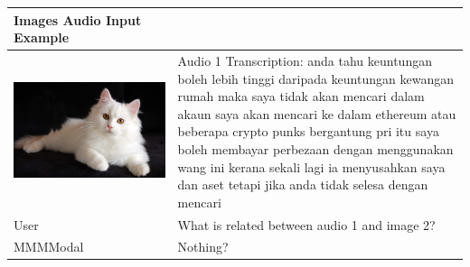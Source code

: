 \documentclass[preprint]{article}
\begin{document}
\begin{table}[hbt]
  \centering
  \setlength{\extrarowheight}{3pt}
  \renewcommand{\arraystretch}{1.5}
  \begin{tabular}{>{\arraybackslash}m{6.5cm}>{\arraybackslash}m{6.5cm}}
    \hline
    \textbf{Images Audio Input Example}                                                                                                                                                                                                                                                                                                                                                                                                                          \\[6pt]
    \hline
    \includegraphics[width=\linewidth,valign=c]{pic/Persian-cat-breed.jpg} & Audio 1 Transcription: anda tahu keuntungan boleh lebih tinggi daripada keuntungan kewangan rumah maka saya tidak akan mencari dalam akaun saya akan mencari ke dalam ethereum atau beberapa crypto punks bergantung pri itu saya boleh membayar perbezaan dengan menggunakan wang ini kerana sekali lagi ia menyusahkan saya dan aset tetapi jika anda tidak selesa dengan mencari \\
    \hline
    User                                                                   & What is related between audio 1 and image 2?                                                                                                                                                                                                                                                                                                                                        \\
    MMMModal                                                               & Nothing?                                                                                                                                                                                                                                                                                                                                                                            \\
    \hline
  \end{tabular}
\end{table}
\end{document}
